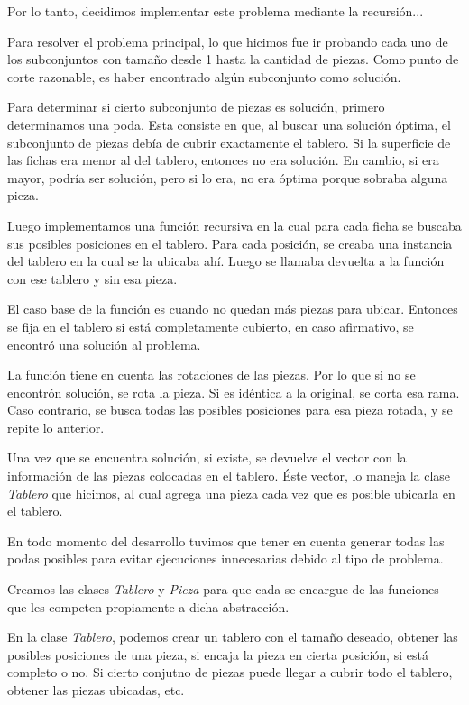 \quad Por lo tanto, decidimos implementar este problema mediante la recursi\'on...

\quad
 
\quad

\quad Para resolver el problema principal, lo que hicimos fue ir probando cada uno de los subconjuntos con tama\~no desde 1 hasta la cantidad de piezas. Como punto de corte razonable, es haber encontrado alg\'un subconjunto como soluci\'on.

\quad Para determinar si cierto subconjunto de piezas es soluci\'on, primero determinamos una poda. Esta consiste en que, al buscar una soluci\'on \'optima, el subconjunto de piezas deb\'ia de cubrir exactamente el tablero. Si la superficie de las fichas era menor al del tablero, entonces no era soluci\'on. En cambio, si era mayor, podr\'ia ser soluci\'on, pero si lo era, no era \'optima porque sobraba alguna pieza. 

\quad Luego implementamos una funci\'on recursiva en la cual para cada ficha se buscaba sus posibles posiciones en el tablero. Para cada posici\'on, se creaba una instancia del tablero en la cual se la ubicaba ah\'i. Luego se llamaba devuelta a la funci\'on con ese tablero y sin esa pieza.

\quad El caso base de la funci\'on es cuando no quedan m\'as piezas para ubicar. Entonces se fija en el tablero si est\'a completamente cubierto, en caso afirmativo, se encontr\'o una soluci\'on al problema.

\quad La funci\'on tiene en cuenta las rotaciones de las piezas. Por lo que si no se encontr\'on soluci\'on, se rota la pieza. Si es id\'entica a la original, se corta esa rama. Caso contrario, se busca todas las posibles posiciones para esa pieza rotada, y se repite lo anterior.

\quad Una vez que se encuentra soluci\'on, si existe, se devuelve el vector con la informaci\'on de las piezas colocadas en el tablero. \'Este vector, lo maneja la clase \textit{Tablero} que hicimos, al cual agrega una pieza cada vez que es posible ubicarla en el tablero.

\quad En todo momento del desarrollo tuvimos que tener en cuenta generar todas las podas posibles para evitar ejecuciones innecesarias debido al tipo de problema.

\quad Creamos las clases \textit{Tablero} y \textit{Pieza} para que cada se encargue de las funciones que les competen propiamente a dicha abstracci\'on. 

\quad En la clase \textit{Tablero}, podemos crear un tablero con el tama\~no deseado, obtener las posibles posiciones de una pieza, si encaja la pieza en cierta posici\'on, si est\'a completo o no. Si cierto conjutno de piezas puede llegar a cubrir todo el tablero, obtener las piezas ubicadas, etc.

